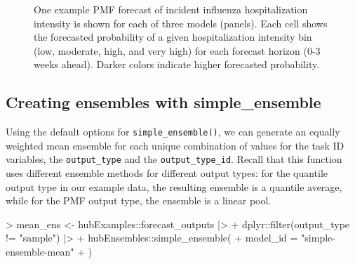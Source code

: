\documentclass[
  letterpaper,
  DIV=11,
  numbers=noendperiod]{scrartcl}
\newenvironment{Shaded}{\begin{snugshade}}{\end{snugshade}}
\newcommand{\AttributeTok}[1]{\textcolor[rgb]{0.40,0.45,0.13}{#1}}
\newcommand{\FunctionTok}[1]{\textcolor[rgb]{0.28,0.35,0.67}{#1}}
\newcommand{\NormalTok}[1]{\textcolor[rgb]{0.00,0.23,0.31}{#1}}
\newcommand{\OtherTok}[1]{\textcolor[rgb]{0.00,0.23,0.31}{#1}}
\newcommand{\SpecialCharTok}[1]{\textcolor[rgb]{0.37,0.37,0.37}{#1}}
\newcommand{\StringTok}[1]{\textcolor[rgb]{0.13,0.47,0.30}{#1}}
\begin{document}
\begin{figure}


\caption{\label{fig-plot-ex-mods-pmf}One example PMF forecast of
incident influenza hospitalization intensity is shown for each of three
models (panels). Each cell shows the forecasted probability of a given
hospitalization intensity bin (low, moderate, high, and very high) for
each forecast horizon (0-3 weeks ahead). Darker colors indicate higher
forecasted probability.}

\end{figure}%

\subsection{Creating ensembles with
simple\_ensemble}\label{creating-ensembles-with-simple_ensemble}

Using the default options for \texttt{simple\_ensemble()}, we can
generate an equally weighted mean ensemble for each unique combination
of values for the task ID variables, the \texttt{output\_type} and the
\texttt{output\_type\_id}. Recall that this function uses different
ensemble methods for different output types: for the quantile output
type in our example data, the resulting ensemble is a quantile average,
while for the PMF output type, the ensemble is a linear pool.

\begin{Shaded}
\begin{Highlighting}[]
\SpecialCharTok{\textgreater{}}\NormalTok{ mean\_ens }\OtherTok{\textless{}{-}}\NormalTok{ hubExamples}\SpecialCharTok{::}\NormalTok{forecast\_outputs }\SpecialCharTok{|\textgreater{}}
\SpecialCharTok{+}\NormalTok{     dplyr}\SpecialCharTok{::}\FunctionTok{filter}\NormalTok{(output\_type }\SpecialCharTok{!=} \StringTok{"sample"}\NormalTok{) }\SpecialCharTok{|\textgreater{}}
\SpecialCharTok{+}\NormalTok{     hubEnsembles}\SpecialCharTok{::}\FunctionTok{simple\_ensemble}\NormalTok{(}
\SpecialCharTok{+}       \AttributeTok{model\_id =} \StringTok{"simple{-}ensemble{-}mean"}
\SpecialCharTok{+}\NormalTok{     )}
\end{Highlighting}
\end{Shaded}
\end{document}
